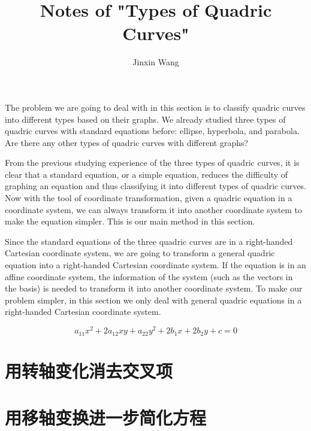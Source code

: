 \documentclass[onecolumn]{ctexart}
\title{Notes of "Types of Quadric Curves"}
\author{Jinxin Wang}
\date{}
\begin{document}
\maketitle

The problem we are going to deal with in this section is to classify quadric 
curves into different types based on their graphs. We already studied three 
types of quadric curves with standard equations before: ellipse, hyperbola, and 
parabola. Are there any other types of quadric curves with different graphs?

From the previous studying experience of the three types of quadric curves, it 
is clear that a standard equation, or a simple equation, reduces the difficulty 
of graphing an equation and thus classifying it into different types of quadric 
curves. Now with the tool of coordinate transformation, given a quadric equation 
in a coordinate system, we can always transform it into another coordinate 
system to make the equation simpler. This is our main method in this section.

Since the standard equations of the three quadric curves are in a right-handed 
Cartesian coordinate system, we are going to transform a general quadric 
equation into a right-handed Cartesian coordinate system. If the equation is in 
an affine coordinate system, the information of the system (such as the vectors 
in the basis) is needed to transform it into another coordinate system. To make 
our problem simpler, in this section we only deal with general quadric equations 
in a right-handed Cartesian coordinate system.

\[
  a_{11}x^2 + 2a_{12} xy + a_{22} y^2 + 2b_1 x + 2b_2 y + c = 0
\]

\section{用转轴变化消去交叉项}

\section{用移轴变换进一步简化方程}
\end{document}
